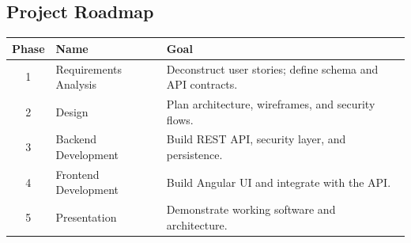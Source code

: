 \subsection{Project Roadmap}
\begin{tabularx}{\textwidth}{@{} c l X @{}}
\toprule
\textbf{Phase} & \textbf{Name} & \textbf{Goal} \\
\midrule
1 & Requirements Analysis & Deconstruct user stories; define schema and API contracts. \\
2 & Design                & Plan architecture, wireframes, and security flows. \\
3 & Backend Development   & Build REST API, security layer, and persistence. \\
4 & Frontend Development  & Build Angular UI and integrate with the API. \\
5 & Presentation          & Demonstrate working software and architecture. \\
\bottomrule
\end{tabularx}

\newpage
